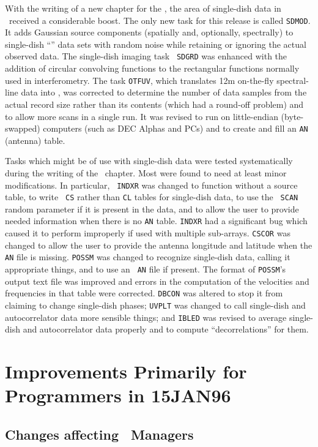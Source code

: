      With the writing of a new chapter for the \Cookbook, the area of
single-dish data in \AIPS\ received a considerable boost.  The only
new task for this release is called \hbox{{\tt SDMOD}}.  It adds
Gaussian source components (spatially and, optionally, spectrally) to
single-dish ``\uv'' data sets with random noise while retaining or
ignoring the actual observed data.  The single-dish imaging task {\tt
SDGRD} was enhanced with the addition of circular convolving functions
to the rectangular functions normally used in interferometry.  The
task {\tt OTFUV}, which translates 12m on-the-fly spectral-line data
into \AIPS, was corrected to determine the number of data samples from
the actual record size rather than its contents (which had a round-off
problem) and to allow more scans in a single run.  It was revised to
run on little-endian (byte-swapped) computers (such as DEC Alphas and
PCs) and to create and fill an {\tt AN} (antenna) table.

     Tasks which might be of use with single-dish data were tested
systematically during the writing of the \Cookbook\ chapter.  Most
were found to need at least minor modifications.  In particular, {\tt
INDXR} was changed to function without a source table, to write {\tt
CS} rather than {\tt CL} tables for single-dish data, to use the {\tt
SCAN} random parameter if it is present in the data, and to allow the
user to provide needed information when there is no {\tt AN} table.
{\tt INDXR} had a significant bug which caused it to perform
improperly if used with multiple sub-arrays.  {\tt CSCOR} was changed
to allow the user to provide the antenna longitude and latitude when
the {\tt AN} file is missing.  {\tt POSSM} was changed to recognize
single-dish data, calling it appropriate things, and to use an {\tt
AN} file if present.  The format of {\tt POSSM}'s output text file was
improved and errors in the computation of the velocities and
frequencies in that table were corrected.  {\tt DBCON} was altered to
stop it from claiming to change single-dish phases; {\tt UVPLT} was
changed to call single-dish and autocorrelator data more sensible
things; and {\tt IBLED} was revised to average single-dish and
autocorrelator data properly and to compute ``decorrelations'' for
them.

\section{Improvements Primarily for Programmers in 15JAN96}

\subsection{Changes affecting \AIPS\ Managers}

